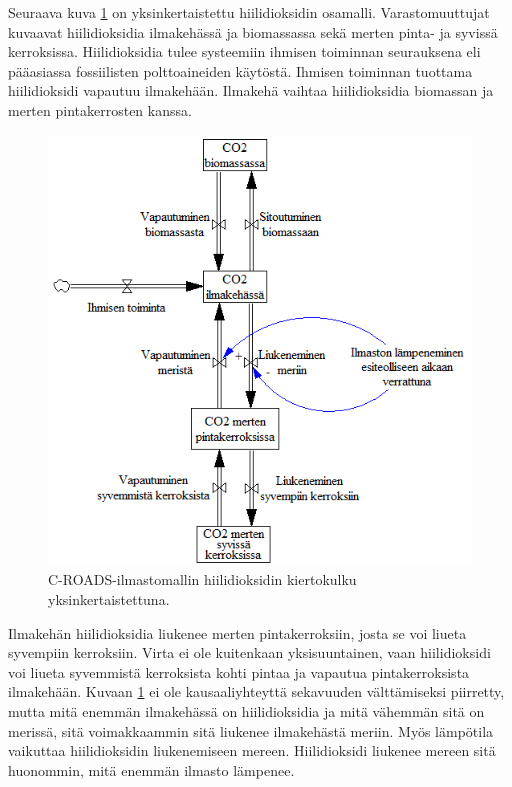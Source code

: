 \documentclass[finnish,12pt,a4paper,pdftex]{article}
\begin{document}
\begin{onehalfspacing}
Seuraava kuva \ref{ilmasto:co2} on yksinkertaistettu hiilidioksidin osamalli. Varastomuuttujat kuvaavat hiilidioksidia ilmakehässä ja biomassassa sekä merten pinta- ja syvissä kerroksissa. Hiilidioksidia tulee systeemiin ihmisen toiminnan seurauksena eli pääasiassa fossiilisten polttoaineiden käytöstä. Ihmisen toiminnan tuottama hiilidioksidi vapautuu ilmakehään. Ilmakehä vaihtaa hiilidioksidia biomassan ja merten pintakerrosten kanssa. \cite{Croads, CroadsFlightSimulator2011}

\begin{figure}[ht]
\centering \includegraphics{c-roads-co2}
\caption{C-ROADS-ilmastomallin hiilidioksidin kiertokulku yksinkertaistettuna. \cite{Croads} \label{ilmasto:co2}}
\end{figure}

Ilmakehän hiilidioksidia liukenee merten pintakerroksiin, josta se voi liueta syvempiin kerroksiin. Virta ei ole kuitenkaan yksisuuntainen, vaan hiilidioksidi voi liueta syvemmistä kerroksista kohti pintaa ja vapautua pintakerroksista ilmakehään. Kuvaan \ref{ilmasto:co2} ei ole kausaaliyhteyttä sekavuuden välttämiseksi piirretty, mutta mitä enemmän ilmakehässä on hiilidioksidia ja mitä vähemmän sitä on merissä, sitä voimakkaammin sitä liukenee ilmakehästä meriin. Myös lämpötila vaikuttaa hiilidioksidin liukenemiseen mereen. Hiilidioksidi liukenee mereen sitä huonommin, mitä enemmän ilmasto lämpenee. \cite{Croads, CroadsFlightSimulator2011}


\end{onehalfspacing}
\end{document}
